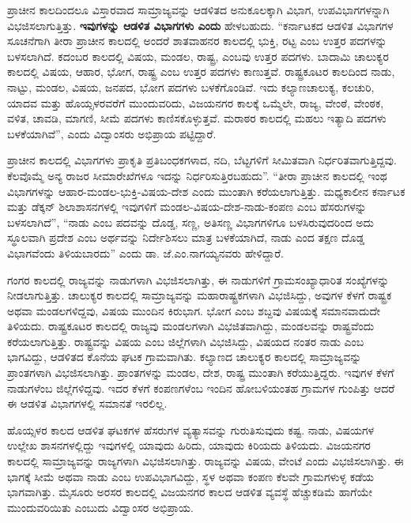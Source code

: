 ಪ್ರಾಚೀನ ಕಾಲದಿಂದಲೂ ವಿಸ್ತಾರವಾದ ಸಾಮ್ರಾಜ್ಯವನ್ನು ಆಡಳಿತದ ಅನುಕೂಲಕ್ಕಾಗಿ ವಿಭಾಗ, ಉಪವಿಭಾಗಗಳನ್ನಾಗಿ ವಿಭಜಿಸಲಾಗುತ್ತಿತ್ತು. \textbf{ಇವುಗಳನ್ನು ಆಡಳಿತ ವಿಭಾಗಗಳು ಎಂದು }ಹೇಳಬಹುದು. “ಕರ್ನಾಟಕದ ಆಡಳಿತ ವಿಭಾಗಗಳ ಸೂಚನೆಗಾಗಿ ತೀರಾ ಪ್ರಾಚೀನ ಕಾಲದಲ್ಲಿ ಅಂದರೆ ಶಾತವಾಹನರ ಕಾಲದಲ್ಲಿ ಭುಕ್ತಿ, ರಟ್ಟ ಎಂಬ ಉತ್ತರ ಪದಗಳನ್ನು ಬಳಸಲಾಗಿದೆ. ಕದಂಬರ ಕಾಲದಲ್ಲಿ ವಿಷಯ, ಮಂಡಲ, ರಾಷ್ಟ್ರ, ಎಂಬವು ಉತ್ತರ ಪದಗಳು. ಬಾದಾಮಿ ಚಾಲುಕ್ಯರ ಕಾಲದಲ್ಲಿ ವಿಷಯ, ಆಹಾರ, ಭೋಗ, ರಾಷ್ಟ್ರ ಎಂಬ ಉತ್ತರ ಪದಗಳು ಕಾಣುತ್ತವೆ. ರಾಷ್ಟ್ರಕೂಟರ ಕಾಲದಿಂದ ನಾಡು, ನಾಟ್ಟು, ಮಂಡಲ, ವಿಷಯ, ಜನಪದ, ಭೋಗ ಪದಗಳು ಬಳಕೆಗೊಂಡಿವೆ. ಇದು ಕಲ್ಯಾಣಚಾಲುಕ್ಯ, ಕಲಚುರಿ, ಯಾದವ ಮತ್ತು ಹೊಯ್ಸಳರವರೆಗೆ ಮುಂದುವರಿದು, ವಿಜಯನಗರ ಕಾಲಕ್ಕೆ ಒಮ್ಮೆಲೇ, ರಾಜ್ಯ, ವೇಂಠೆ, ವೇಂಠಕ, ವಳಿತ, ಚಾವಡಿ, ಮಾಗಣಿ, ಸೀಮೆ ಪದಗಳು ಕಾಣಿಸಕೊಳ್ಳುತ್ತವೆ. ಮರಾಠರ ಕಾಲದಲ್ಲಿ ಮಹಲು ಇತ್ಯಾದಿ ಪದಗಳು ಬಳಕೆಯಾಗಿವೆ”, ಎಂದು ವಿದ್ವಾಂಸರು ಅಭಿಪ್ರಾಯ ಪಟ್ಟಿದ್ದಾರೆ.

ಪ್ರಾಚೀನ ಕಾಲದಲ್ಲಿ ವಿಭಾಗಗಳು ಪ್ರಾಕೃತಿ ಪ್ರತಿಬಂಧಕಗಳಾದ, ನದಿ, ಬೆಟ್ಟಗಳಿಗೆ ಸೀಮಿತವಾಗಿ ನಿರ್ಧರಿತವಾಗು\-ತ್ತಿದ್ದವು. ಕೆಲವೊಮ್ಮೆ ಅನ್ಯ ರಾಜರ ಸೀಮಾರೇಖೆಗಳೂ ಇದನ್ನು ನಿರ್ಧರಿಸುತ್ತಿರಬಹುದು”. “ತೀರಾ ಪ್ರಾಚೀನ ಕಾಲದಲ್ಲಿ ಇಂಥ ವಿಭಾಗಗಳನ್ನು ಆಹಾರ-ಮಂಡಲ-ಭುಕ್ತಿ-ವಿಷಯ-ದೇಶ ಎಂದು ಮುಂತಾಗಿ ಕರೆಯಲಾಗುತ್ತಿತ್ತು. ಮಧ್ಯಕಾಲೀನ ಕರ್ನಾಟಕ ಮತ್ತು ಡೆಕ್ಕನ್​ ಶಿಲಾಶಾಸನಗಳಲ್ಲಿ ಇವುಗಳಿಗೆ ಮಂಡಲ-ವಿಷಯ-ದೇಶ-ನಾಡು-ಕಂಪಣ ಎಂಬ ಹೆಸರುಗಳನ್ನು ಬಳಸಲಾಗಿದೆ”, “ನಾಡು ಎಂಬ ಪದವನ್ನು ದೊಡ್ಡ, ಸಣ್ಣ, ಅತಿಸಣ್ಣ ವಿಭಾಗಗಳಿಗೂ ಬಳಸಿರುವುದರಿಂದ ಅದು ಸ್ಥೂಲವಾಗಿ ಪ್ರದೇಶ ಎಂಬ ಅರ್ಥವನ್ನು ನಿರ್ದೇಶಿಸಲು ಮಾತ್ರ ಬಳಕೆಯಾಗಿದೆ, ನಾಡು ಎಂದ ತಕ್ಷಣ ದೊಡ್ಡ ವಿಭಾಗವೆಂದು ತಿಳಿಯಬಾರದು” ಎಂದು ಡಾ. ಜೆ.ಎಂ.ನಾಗಯ್ಯನವರು ಹೇಳಿದ್ದಾರೆ.

ಗಂಗರ ಕಾಲದಲ್ಲಿ ರಾಜ್ಯವನ್ನು ನಾಡುಗಳಾಗಿ ವಿಭಜಿಸಲಾಗಿತ್ತು, ಈ ನಾಡುಗಳಿಗೆ ಗ್ರಾಮಸಂಖ್ಯಾಧಾರಿತ ಸಂಖ್ಯೆಗಳನ್ನು ನೀಡಲಾಗುತ್ತಿತ್ತು. ಚಾಲುಕ್ಯರ ಕಾಲದಲ್ಲಿ ಸಾಮ್ರಾಜ್ಯವನ್ನು ಮಹಾರಾಷ್ಟ್ರಕಗಳಾಗಿ ವಿಭಜಿಸಿದ್ದು, ಅವುಗಳ ಕೆಳಗೆ ರಾಷ್ಟ್ರಕ ಅಥವಾ ಮಂಡಲಗಳಿದ್ದವು, ವಿಷಯ ಮುಂದಿನ ಕಿರುಭಾಗ. ಭೋಗ ಎಂಬ ಶಬ್ದವು ವಿಷಯಕ್ಕೆ ಸಮಾನವಾದುದೇ ತಿಳಿಯದು. ರಾಷ್ಟ್ರಕೂಟರ ಕಾಲದಲ್ಲಿ ರಾಜ್ಯವು ಮಂಡಲಗಳಾಗಿ ವಿಭಜಿತವಾಗಿದ್ದು, ಮಂಡಲವನ್ನು ರಾಷ್ಟ್ರವೆಂದು ಕರೆಯಲಾಗುತ್ತಿತ್ತು. ರಾಷ್ಟ್ರವನ್ನು ವಿಷಯ ಎಂಬ ಜಿಲ್ಲೆಗಳಾಗಿ ವಿಭಜಿಸಿದ್ದು, ವಿಷಯದ ನಂತರ ನಾಡು ಎಂಬ ಭಾಗವಿದ್ದು, ಆಡಳಿತದ ಕೊನೆಯ ಘಟಕ ಗ್ರಾಮವಾಗಿತು. ಕಲ್ಯಾಣದ ಚಾಲುಕ್ಯರ ಕಾಲದಲ್ಲಿ ಸಾಮ್ರಾಜ್ಯವನ್ನು ಪ್ರಾಂತಗಳಾಗಿ ವಿಭಜಿಸಲಾಗಿತ್ತು. ಪ್ರಾಂತಗಳನ್ನು ಮಂಡಲ, ದೇಶ, ರಾಷ್ಟ್ರ ಮುಂತಾಗಿ ಕರೆಯುತ್ತಿದ್ದರು. ಇವುಗಳ ಕೆಳಗೆ ನಾಡುಗಳೆಂಬ ಜಿಲ್ಲೆಗಳಿದ್ದವು. ಇದರ ಕೆಳಗೆ ಕಂಪಣಗಳೆಂಬ ಇಂದಿನ ಹೋಬಳಿಯಂತಹ ಗ್ರಾಮಗಳ ಗುಂಪಿತ್ತು ಆದರೆ ಈ ಆಡಳಿತ ವಿಭಾಗಗಳಲ್ಲಿ ಸಮಾನತೆ ಇರಲಿಲ್ಲ.

ಹೊಯ್ಸಳರ ಕಾಲದ ಆಡಳಿತ ಘಟಕಗಳ ಹೆಸರುಗಳ ವ್ಯತ್ಯಾಸವನ್ನು ಗುರುತಿಸುವುದು ಕಷ್ಟ. ನಾಡು, ವಿಷಯಗಳ ಉಲ್ಲೇಖ ಶಾಸನಗಳಲ್ಲಿದ್ದು ಇವುಗಳಲ್ಲಿ ಯಾವುದು ಹಿರಿದು, ಯಾವುದು ಕಿರಿಯದು ತಿಳಿಯದು. ವಿಜಯನಗರ ಕಾಲದಲ್ಲಿ ಸಾಮ್ರಾಜ್ಯವನ್ನು ರಾಜ್ಯಗಳಾಗಿ ವಿಭಜಿಸಲಾಗಿತ್ತು. ರಾಜ್ಯವನ್ನು ವಿಷಯ, ವೇಂಟೆ ಎಂದು ವಿಭಜಿಸಲಾಗಿತ್ತು. ಈ ಭಾಗಕ್ಕೆ ಸೀಮೆ ಅಥವಾ ನಾಡು ಎಂಬ ಉಪವಿಭಾಗವಿದ್ದು, ಸ್ಥಳ ಅಥವಾ ಕಂಪಣ ಕೆಲವೇ ಗ್ರಾಮಗಳುಳ್ಳ ಕಡೆಯ ಭಾಗವಾಗಿತ್ತು. ಮೈಸೂರು ಅರಸರ ಕಾಲದಲ್ಲಿ ವಿಜಯನಗರ ಕಾಲದ ಆಡಳಿತ ವ್ಯವಸ್ಥೆ ಹೆಚ್ಚುಕಡಿಮೆ ಹಾಗೆಯೇ ಮುಂದುವರಿಯಿತು ಎಂಬುದು ವಿದ್ವಾಂಸರ ಅಭಿಪ್ರಾಯ.

